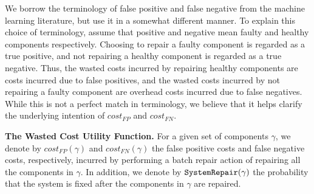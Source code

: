 \documentclass[review]{elsarticle}
\newtheorem{definition}{Definition}
\newcommand\sysrep[1]{{\tt SystemRepair(#1)}}
\newcommand{\brps}{\textit{BRP$_S$}}
\newcommand{\COMPS}{\textit{COMPS}}
\begin{document}
We borrow the terminology of false positive and false negative from the machine learning literature, but use it in a somewhat different manner. To explain this choice of terminology, assume that positive and negative mean faulty and healthy components respectively. Choosing to repair a faulty component is regarded as a true positive, and not repairing a healthy component is regarded as a true negative. Thus, the wasted costs incurred by repairing healthy components are costs incurred due to false positives, and the wasted costs incurred by not repairing a faulty component are overhead costs incurred due to false negatives. While this is not a perfect match in terminology, we believe that it helps clarify the underlying intention of $cost_{FP}$ and $cost_{FN}$.












\noindent \textbf{The Wasted Cost Utility Function.}
For a given set of components $\gamma$, we denote by $cost_{FP}(\gamma)$ and $cost_{FN}(\gamma)$ the false positive costs and false negative costs, respectively, incurred by performing a batch repair action of repairing all the components in $\gamma$. In addition, we denote by $\sysrep{\gamma}$ the probability that the system is fixed after the components in $\gamma$ are repaired. 
\end{document}
